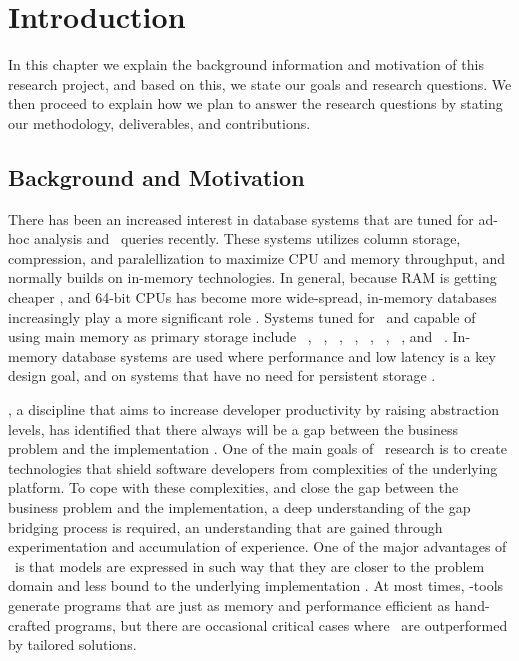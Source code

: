 \chapter{Introduction}
\label{chap:introduction}
In this chapter we explain the background information and motivation of this research project, and based on this, we state our goals and research questions. We then proceed to explain how we plan to answer the research questions by stating our methodology, deliverables, and contributions.
\clearpage

\section{Background and Motivation}
\label{sec:Background and Motivation}
There has been an increased interest in database systems that are tuned for ad-hoc analysis and \bi~queries recently. These systems utilizes column storage, compression, and paralellization to maximize CPU and memory throughput, and normally builds on in-memory technologies. In general, because RAM is getting cheaper \cite{Exasol2014-xh}, and 64-bit CPUs has become more wide-spread, in-memory databases increasingly play a more significant role \cite{Delaney2014-ip}. Systems tuned for \bi~and capable of using main memory as primary storage include \oracle~\cite{Lahiri2015-mz}, \saph~\cite{Farber2012-vh}, \gorilla~\cite{Pelkonen2015-ko}, \qlikview~\cite{Qlik2011-ef}, \tableau~\cite{Kamkolkar2015-iq}, \monetdb~\cite{Boncz2002-yj}, \blink~\cite{Barber2012-xt}, and \sapnw~\cite{Lemke2010-is}. In-memory database systems are used where performance and low latency is a key design goal, and on systems that have no need for persistent storage \cite{Zicari2012-is}.

\mde, a discipline that aims to increase developer productivity by raising abstraction levels, has identified that there always will be a gap between the business problem and the implementation \cite{France2007-ae}. One of the main goals of \mdd~research is to create technologies that shield software developers from complexities of the underlying platform. To cope with these complexities, and close the gap between the business problem and the implementation, a deep understanding of the gap bridging process is required, an understanding that are gained through experimentation and accumulation of experience. One of the major advantages of \mde~is that models are expressed in such way that they are closer to the problem domain and less bound to the underlying implementation \cite{Selic2003-qa}. At most times, \mdd-tools generate programs that are just as memory and performance efficient as hand-crafted programs, but there are occasional critical cases where \mde~are outperformed by tailored solutions.

